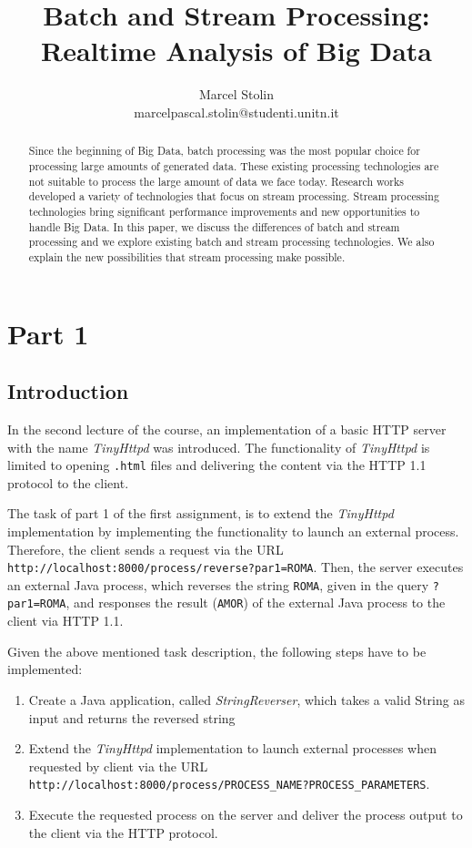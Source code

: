 \documentclass{article}
\title{Batch and Stream Processing: Realtime Analysis of Big Data}
\date{}
\author{Marcel Stolin \\ marcelpascal.stolin@studenti.unitn.it}
\begin{document}
\maketitle


\begin{abstract}
Since the beginning of Big Data, batch processing was the most popular choice for processing large amounts of generated data. These existing processing technologies are not suitable to process the large amount of data we face today. Research works developed a variety of technologies that focus on stream processing. Stream processing technologies bring significant performance improvements and new opportunities to handle Big Data. In this paper, we discuss the differences of batch and stream processing and we explore existing batch and stream processing technologies. We also explain the new possibilities that stream processing make possible.
\end{abstract}

\section{Part 1}\label{sec:01_part1}

\subsection{Introduction}\label{subsec:01_part1_intro}
In the second lecture of the course, an implementation of a basic HTTP server with the name \textit{TinyHttpd} was introduced.
The functionality of \textit{TinyHttpd} is limited to opening \texttt{.html} files and delivering the content via the HTTP 1.1 protocol to the client.


The task of part 1 of the first assignment, is to extend the \textit{TinyHttpd} implementation by implementing the functionality to launch an external process. Therefore, the client sends a request via the URL \texttt{http://localhost:8000/process/reverse?par1=ROMA}. Then, the server executes an external Java process, which reverses the string \texttt{ROMA}, given in the query \texttt{?par1=ROMA}, and responses the result (\texttt{AMOR}) of the external Java process to the client via HTTP 1.1.


Given the above mentioned task description, the following steps have to be implemented:
\begin{enumerate}
\item Create a Java application, called \textit{StringReverser}, which takes a valid String as input and returns the reversed string
\item Extend the \textit{TinyHttpd} implementation to launch external processes when requested by client via the URL \texttt{http://localhost:8000/process/PROCESS\_NAME?PROCESS\_PARAMETERS}.
\item Execute the requested process on the server and deliver the process output to the client via the HTTP protocol.
\end{enumerate}
\end{document}
